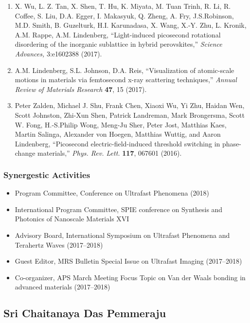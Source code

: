 \begin{enumerate}
    \item X. Wu, L. Z. Tan, X. Shen, T. Hu, K. Miyata, M. Tuan Trinh, R. Li, R. Coffee, S. Liu, D.A. Egger, I. Makasyuk, Q. Zheng, A. Fry, J.S.Robinson, M.D. Smith, B. Guzelturk, H.I. Karunadasa, X. Wang, X.-Y. Zhu, L. Kronik, A.M. Rappe, A.M. Lindenberg, “Light-induced picosecond rotational disordering of the inorganic sublattice in hybrid perovskites,” {\it Science Advances,} 3:e1602388 (2017).  
    \item A.M. Lindenberg, S.L. Johnson, D.A. Reis, “Visualization of atomic-scale motions in materials via femtosecond x-ray scattering techniques,” {\it Annual Review of Materials Research} {\bf 47}, 15 (2017).
    \item Peter Zalden, Michael J. Shu, Frank Chen, Xiaoxi Wu, Yi Zhu, Haidan Wen, Scott Johnston, Zhi-Xun Shen, Patrick Landreman, Mark Brongersma, Scott W. Fong, H.-S.Philip Wong, Meng-Ju Sher, Peter Jost, Matthias Kaes, Martin Salinga, Alexander von Hoegen, Matthias Wuttig, and Aaron Lindenberg, “Picosecond electric-field-induced threshold switching in phase-change materials,” {\it Phys. Rev. Lett.} {\bf 117}, 067601 (2016). 
\end{enumerate}

\subsubsection*{Synergestic Activities}

\begin{itemize}
    \item Program Committee, Conference on Ultrafast Phenomena (2018)
    \item International Program Committee, SPIE conference on Synthesis and Photonics of Nanoscale Materials XVI
    \item Advisory Board, International Symposium on Ultrafast Phenomena and Terahertz Waves (2017–2018)
    \item Guest Editor, MRS Bulletin Special Issue on Ultrafast Imaging (2017–2018)
    \item Co-organizer, APS March Meeting Focus Topic on Van der Waals bonding in advanced materials (2017–2018)
\end{itemize}

\clearpage

\subsection*{Sri Chaitanaya Das Pemmeraju}

